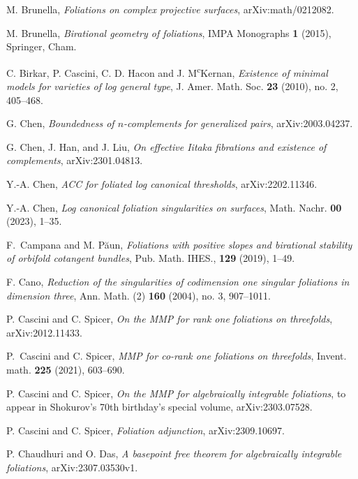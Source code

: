\documentclass[11pt]{amsart}
\numberwithin{equation}{section}
\theoremstyle{definition}
\theoremstyle{definition}
\theoremstyle{definition}
\begin{document}
\begin{thebibliography}{99}
 M. Brunella, \textit{Foliations on complex projective surfaces}, arXiv:math/0212082.


 M. Brunella, \textit{Birational geometry of foliations}, IMPA Monographs \textbf{1} (2015), Springer, Cham.

C. Birkar, P. Cascini, C. D. Hacon and J. M\textsuperscript{c}Kernan, \textit{Existence of minimal models for varieties of log general type}, J. Amer. Math. Soc. \textbf{23} (2010), no. 2, 405--468.

 G. Chen, \textit{Boundedness of $n$-complements for generalized pairs}, arXiv:2003.04237.


 G. Chen, J. Han, and J. Liu, \textit{On effective Iitaka fibrations and existence of complements}, arXiv:2301.04813.

 Y.-A. Chen, \textit{ACC for foliated log canonical thresholds}, arXiv:2202.11346.

 Y.-A. Chen, \textit{Log canonical foliation singularities on surfaces}, Math. Nachr. \textbf{00} (2023), 1--35.

 F.~Campana and M. P\u{a}un, \textit{Foliations with positive slopes and birational stability of orbifold cotangent bundles}, Pub. Math. IHES., \textbf{129} (2019), 1--49.

 F. Cano, \textit{Reduction of the singularities of codimension one singular foliations in dimension three}, Ann. Math. (2) \textbf{160} (2004), no. 3, 907--1011.

 P. Cascini and C. Spicer, \textit{On the MMP for rank one foliations on threefolds}, arXiv:2012.11433.

 P.~Cascini and C. Spicer, \textit{MMP for co-rank one foliations on threefolds}, Invent. math. \textbf{225} (2021), 603--690.

 P. Cascini and C. Spicer, \textit{On the MMP for algebraically integrable foliations}, to appear in Shokurov's 70th birthday's special volume, arXiv:2303.07528.

 P. Cascini and C. Spicer, \textit{Foliation adjunction}, arXiv:2309.10697.


 P. Chaudhuri and O. Das, \textit{A basepoint free theorem for algebraically integrable foliations}, arXiv:2307.03530v1.


\end{thebibliography}
\end{document}
